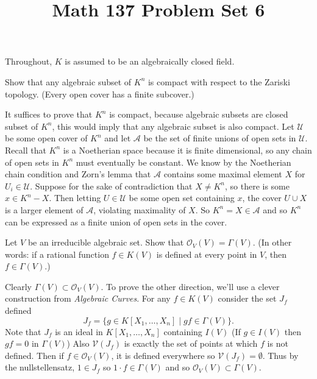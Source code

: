 \documentclass[11pt,letterpaper]{article}
\title{\textbf{Math 137 Problem Set 6}}
\begin{document}
\maketitle

Throughout, $K$ is assumed to be an algebraically closed field.
\begin{problem}
    Show that any algebraic subset of $K^n$ is compact with respect to the Zariski topology. (Every open cover has a finite subcover.)
\end{problem}

\begin{solution}
    It suffices to prove that $K^n$ is compact, because algebraic subsets are closed subset of $K^n$, this would imply that any algebraic subset is also compact. Let $\mathcal{U}$ be some open cover of $K^n$ and let $\mathcal{A}$ be the set of finite unions of open sets in $\mathcal{U}$. Recall that $K^n$ is a Noetherian space because it is finite dimensional, so any chain of open sets in $K^n$ must eventually be constant. We know by the Noetherian chain condition and Zorn's lemma that $\mathcal{A}$ contains some maximal element $X$ for $U_i\in \mathcal{U}$. Suppose for the sake of contradiction that $X\neq K^n$, so there is some $x\in K^n-X$. Then letting $U\in \mathcal{U}$ be some open set containing $x$, the cover $U\cup X$ is a larger element of $\mathcal{A}$, violating maximality of $X$. So $K^n=X\in \mathcal{A}$ and so $K^n$ can be expressed as a finite union of open sets in the cover. 
\end{solution}

\begin{problem}
    Let $V$ be an irreducible algebraic set. Show that $\mathcal O_V(V) = \Gamma(V)$. (In other words: if a rational function $f\in K(V)$ is defined at every point in $V$, then $f\in\Gamma(V)$.)
\end{problem}

\begin{solution}
    Clearly $\Gamma(V)\subset \mathcal{O}_V(V)$. To prove the other direction, we'll use a clever construction from \textit{Algebraic Curves}. For any $f\in K(V)$ consider the set $J_f$ defined
    \[
        J_f = \{g\in K[X_1,\ldots,X_n]\mid gf\in \Gamma(V)\}
    .\] 
    Note that $J_f$ is an ideal in $K[X_1,\ldots,X_n]$ containing $I(V)$ (If $g\in I(V)$ then $gf=0$ in $\Gamma(V)$) Also $\mathcal{V}(J_f)$ is exactly the set of points at which $f$ is not defined. Then if $f\in \mathcal{O}_V(V)$, it is defined everywhere so $\mathcal{V}(J_f)=\emptyset$. Thus by the nullstellensatz, $1\in J_f$ so $1\cdot f\in \Gamma(V)$ and so $\mathcal{O}_V(V)\subset \Gamma(V)$.
\end{solution}
\end{document}
